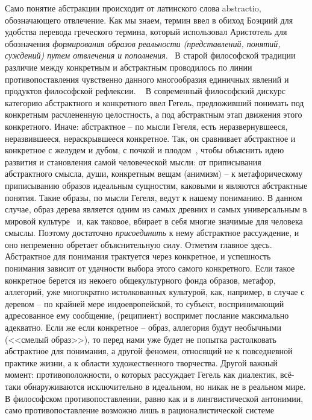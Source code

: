 Само понятие абстракции происходит от латинского слова abstractio, обозначающего отвлечение.
Как мы знаем, термин ввел в обиход Боэциий для удобства перевода греческого термина,
который использовал Аристотель для обозначения \emph{формирования образов реальности
(представлений, понятий, суждений) путем отвлечения и пополнения}.~\autocite{arnoldov}
В старой философской традиции различие между конкретным и абстрактным проводилось по линии
противопоставления чувственно данного многообразия единичных явлений и продуктов философской рефлексии.
~\autocite{bogomolov, sokolov} В современный философский дискурс категорию абстрактного
и конкретного ввел Гегель, предложивший понимать под конкретным расчлененную целостность,
а под абстрактным этап движения этого конкретного. Иначе: абстрактное -- по мысли Гегеля,
есть неразвернувшееся, неразвившееся, нераскрывшееся конкретное.\autocite{arnoldov}
Так, он сравнивает абстрактное и конкретное с желудем и дубом, с почкой и плодом~\autocite{gegel},
чтобы объяснить идею развития и становления самой человеческой мысли:
от приписывания абстрактного смысла, души, конкретным вещам (анимизм) -- к метафорическому приписыванию
образов идеальным сущностям, каковыми и являются абстрактные понятия. Такие образы,
по мысли Гегеля, ведут к нашему пониманию. В данном случае, образ дерева является одним
из самых древних и самых универсальным в мировой культуре~
\autocite{toporov} и, как таковое, вбирает в себя многие значимые для человека смыслы.
Поэтому достаточно \emph{присоединить} к нему абстрактное рассуждение, и оно непременно
обретает объяснительную силу. Отметим главное здесь. Абстрактное для понимания трактуется
через конкретное, и успешность понимания зависит от удачности выбора этого самого конкретного.
Если такое конкретное берется из некоего общекультурного фонда образов, метафор,
аллегорий, уже многократно истолкованных культурой, как, например, в случае с деревом --
по крайней мере индоевропейской, то субъект, воспринимающий адресованное ему сообщение,
(реципиент) воспримет послание максимально адекватно. Если же если конкретное --
образ, аллегория будут необычными (<<смелый образ>>), то перед нами уже будет не попытка
растолковать абстрактное для понимания, а другой феномен, относящий не к повседневной практике жизни,
а к области художественного творчества. Другой важный момент: противоположности, о которых
рассуждает Гегель как диалектик, всё-таки обнаруживаются исключительно в идеальном,
но никак не в реальном мире. В философском противопоставлении, равно как и в
лингвистической антонимии, само противопоставление возможно лишь в рационалистической системе
